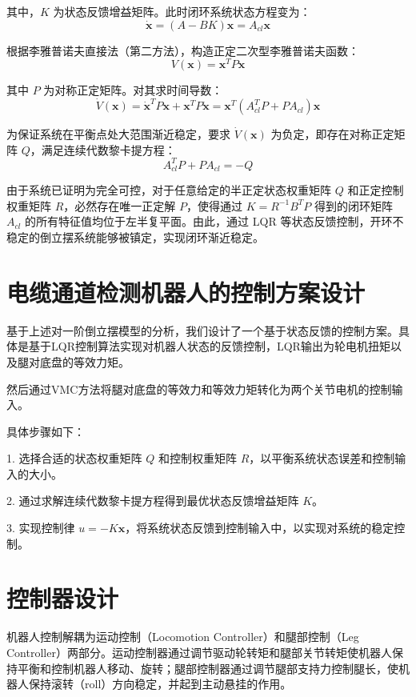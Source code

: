 \documentclass[
  oneside,
  degree=bachelor,
  fullwidthstop=false,
  fontset=fandol,
  times=false,
  minted=true,
  biblatex=true,
]{tongjithesis}
\begin{document}
其中，$K$ 为状态反馈增益矩阵。此时闭环系统状态方程变为：
\begin{equation}
\dot{\mathbf{x}} = (A - BK)\mathbf{x} = A_{cl}\mathbf{x}
\end{equation}

根据李雅普诺夫直接法（第二方法），构造正定二次型李雅普诺夫函数：
\begin{equation}
V(\mathbf{x}) = \mathbf{x}^T P \mathbf{x}
\end{equation}

其中 $P$ 为对称正定矩阵。对其求时间导数：
\begin{equation}
\dot{V}(\mathbf{x}) = \dot{\mathbf{x}}^T P \mathbf{x} + \mathbf{x}^T P \dot{\mathbf{x}} = \mathbf{x}^T (A_{cl}^T P + P A_{cl}) \mathbf{x}
\end{equation}

为保证系统在平衡点处大范围渐近稳定，要求 $\dot{V}(\mathbf{x})$ 为负定，即存在对称正定矩阵 $Q$，满足连续代数黎卡提方程：
\begin{equation}
A_{cl}^T P + P A_{cl} = -Q
\end{equation}

由于系统已证明为完全可控，对于任意给定的半正定状态权重矩阵 $Q$ 和正定控制权重矩阵 $R$，必然存在唯一正定解 $P$，使得通过 $K = R^{-1}B^T P$ 得到的闭环矩阵 $A_{cl}$ 的所有特征值均位于左半复平面。由此，通过 LQR 等状态反馈控制，开环不稳定的倒立摆系统能够被镇定，实现闭环渐近稳定。

\section{电缆通道检测机器人的控制方案设计}
基于上述对一阶倒立摆模型的分析，我们设计了一个基于状态反馈的控制方案。具体是基于LQR控制算法实现对机器人状态的反馈控制，LQR输出为轮电机扭矩以及腿对底盘的等效力矩。

然后通过VMC方法将腿对底盘的等效力和等效力矩转化为两个关节电机的控制输入。

具体步骤如下：

1. 选择合适的状态权重矩阵 $Q$ 和控制权重矩阵 $R$，以平衡系统状态误差和控制输入的大小。

2. 通过求解连续代数黎卡提方程得到最优状态反馈增益矩阵 $K$。

3. 实现控制律 $u = -K\mathbf{x}$，将系统状态反馈到控制输入中，以实现对系统的稳定控制。

\section{控制器设计}
机器人控制解耦为运动控制（Locomotion Controller）和腿部控制（Leg Controller）两部分。运动控制器通过调节驱动轮转矩和腿部关节转矩使机器人保持平衡和控制机器人移动、旋转；腿部控制器通过调节腿部支持力控制腿长，使机器人保持滚转（roll）方向稳定，并起到主动悬挂的作用。
\end{document}
